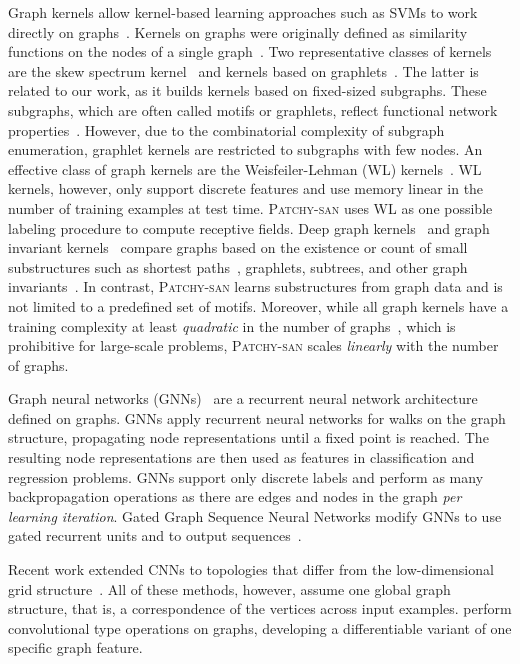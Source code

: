 \documentclass{article}
\newcommand{\patchysan}{{\textsc{Patchy-san}}\xspace}
\begin{document}
Graph kernels allow kernel-based learning approaches such as SVMs to work directly on graphs~\cite{Vishwanathan:2010}. Kernels on graphs were originally defined as similarity functions on the nodes of a single graph~\cite{Kondor:2002}. Two representative classes of kernels are the skew spectrum kernel~\cite{Kondor:2008} and kernels based on  graphlets~\cite{Kondor:2009,Shervashidze:2009}. The latter is related to our work, as it builds kernels based on fixed-sized subgraphs. These subgraphs, which are often called motifs or graphlets, reflect functional network properties~\cite{milo:2002,alon:2007}. However, due to the combinatorial complexity of subgraph enumeration, graphlet kernels are restricted to subgraphs with few nodes. An effective class of graph kernels are the Weisfeiler-Lehman (WL) kernels~\cite{Shervashidze:2011}. WL kernels, however, only support discrete features and use memory linear in the number of training examples at test time. \patchysan uses WL as one possible labeling procedure to compute receptive fields. 
Deep graph kernels~\cite{Yanardag:2015} and graph invariant kernels~\cite{Orsini:2015} compare graphs based on the existence or count of small substructures such as shortest paths~\cite{Borgwardt:2005}, graphlets, subtrees, and other graph invariants~\cite{haussler:1999,Orsini:2015}.  In contrast, \patchysan learns substructures from graph data and is not limited to a predefined set of motifs. Moreover, while all  graph kernels have a training complexity at least \emph{quadratic} in the number of graphs~\cite{Shervashidze:2011}, which is prohibitive for large-scale problems, \patchysan scales \emph{linearly} with the number of graphs.

Graph neural networks (GNNs)~\cite{Scarselli:2009} are a recurrent neural network architecture defined on graphs. GNNs apply recurrent neural networks for walks on the graph structure, propagating node representations until a fixed point is reached. The resulting node representations are then used as features in classification and regression problems. GNNs support only discrete labels and perform as many backpropagation operations as there are edges and nodes in the graph \emph{per learning iteration}. Gated Graph Sequence Neural Networks modify GNNs to use gated recurrent units and to output sequences~\cite{li:2015}. 

Recent work extended CNNs to topologies that differ from the low-dimensional grid structure~\cite{bruna:2013,henaff:2015}. All of these methods, however, assume one global  graph structure, that is, a correspondence of the vertices across input examples. 
\cite{duvenaud:2015} perform convolutional type operations on graphs, developing a differentiable variant of one specific graph feature.
\end{document}
